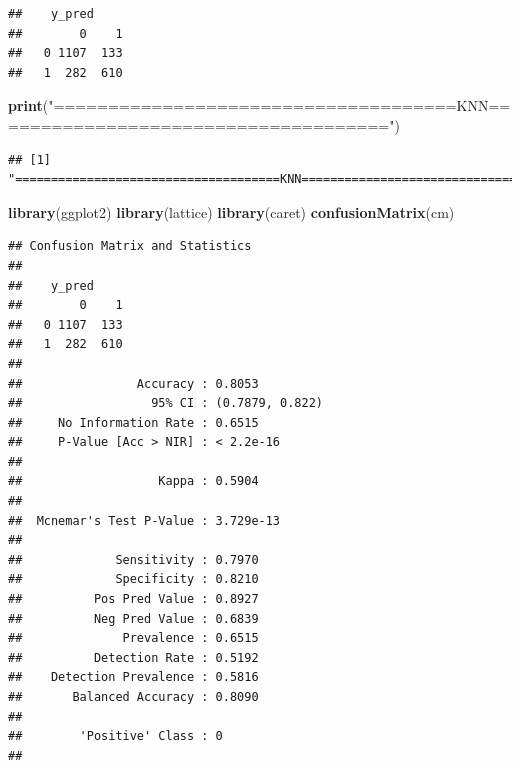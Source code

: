 \documentclass[
]{article}
\newenvironment{Shaded}{\begin{snugshade}}{\end{snugshade}}
\newcommand{\KeywordTok}[1]{\textcolor[rgb]{0.13,0.29,0.53}{\textbf{#1}}}
\newcommand{\NormalTok}[1]{#1}
\newcommand{\StringTok}[1]{\textcolor[rgb]{0.31,0.60,0.02}{#1}}
\begin{document}
\begin{verbatim}
##    y_pred
##        0    1
##   0 1107  133
##   1  282  610
\end{verbatim}

\begin{Shaded}
\begin{Highlighting}[]
\KeywordTok{print}\NormalTok{(}\StringTok{"=====================================KNN====================================="}\NormalTok{)}
\end{Highlighting}
\end{Shaded}

\begin{verbatim}
## [1] "=====================================KNN====================================="
\end{verbatim}

\begin{Shaded}
\begin{Highlighting}[]
\KeywordTok{library}\NormalTok{(ggplot2)}
\KeywordTok{library}\NormalTok{(lattice)}
\KeywordTok{library}\NormalTok{(caret)}
\KeywordTok{confusionMatrix}\NormalTok{(cm)}
\end{Highlighting}
\end{Shaded}

\begin{verbatim}
## Confusion Matrix and Statistics
## 
##    y_pred
##        0    1
##   0 1107  133
##   1  282  610
##                                          
##                Accuracy : 0.8053         
##                  95% CI : (0.7879, 0.822)
##     No Information Rate : 0.6515         
##     P-Value [Acc > NIR] : < 2.2e-16      
##                                          
##                   Kappa : 0.5904         
##                                          
##  Mcnemar's Test P-Value : 3.729e-13      
##                                          
##             Sensitivity : 0.7970         
##             Specificity : 0.8210         
##          Pos Pred Value : 0.8927         
##          Neg Pred Value : 0.6839         
##              Prevalence : 0.6515         
##          Detection Rate : 0.5192         
##    Detection Prevalence : 0.5816         
##       Balanced Accuracy : 0.8090         
##                                          
##        'Positive' Class : 0              
## 
\end{verbatim}
\end{document}
